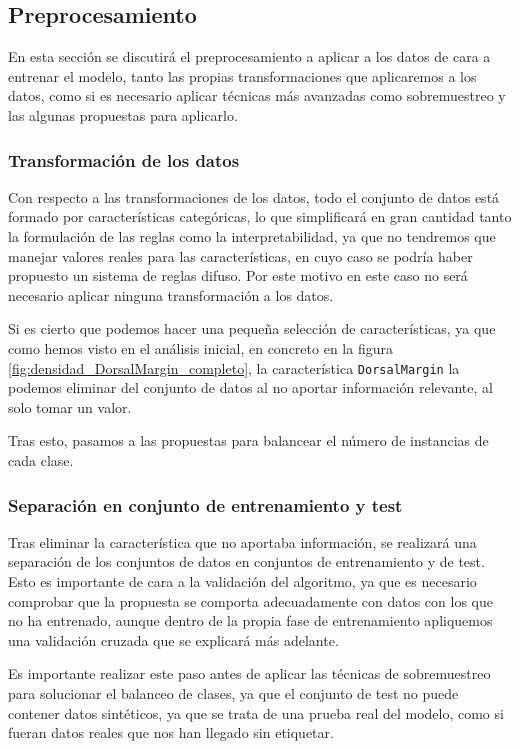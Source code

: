 \subsection{Preprocesamiento} \label{sobremuestreo}

En esta sección se discutirá el preprocesamiento a aplicar a los datos de cara a entrenar el modelo, tanto las propias transformaciones que aplicaremos a los datos, como si es necesario aplicar técnicas más avanzadas como sobremuestreo y las algunas propuestas para aplicarlo.

\subsubsection{Transformación de los datos}

Con respecto a las transformaciones de los datos, todo el conjunto de datos está formado por características categóricas, lo que simplificará en gran cantidad tanto la formulación de las reglas como la interpretabilidad, ya que no tendremos que manejar valores reales para las características, en cuyo caso se podría haber propuesto un sistema de reglas difuso. Por este motivo en este caso no será necesario aplicar ninguna transformación a los datos.

Si es cierto que podemos hacer una pequeña selección de características, ya que como hemos visto en el análisis inicial, en concreto en la figura \ref{fig:densidad_DorsalMargin_completo}, la característica \texttt{DorsalMargin} la podemos eliminar del conjunto de datos al no aportar información relevante, al solo tomar un valor.

Tras esto, pasamos a las propuestas para balancear el número de instancias de cada clase.

\subsubsection{Separación en conjunto de entrenamiento y test}

Tras eliminar la característica que no aportaba información, se realizará una separación de los conjuntos de datos en conjuntos de entrenamiento y de test. Esto es importante de cara a la validación del algoritmo, ya que es necesario comprobar que la propuesta se comporta adecuadamente con datos con los que no ha entrenado, aunque dentro de la propia fase de entrenamiento apliquemos una validación cruzada que se explicará más adelante.

Es importante realizar este paso antes de aplicar las técnicas de sobremuestreo para solucionar el balanceo de clases, ya que el conjunto de test no puede contener datos sintéticos, ya que se trata de una prueba real del modelo, como si fueran datos reales que nos han llegado sin etiquetar.

